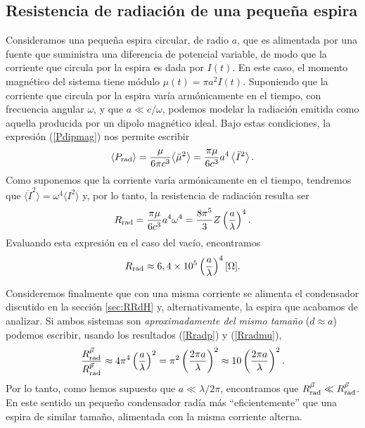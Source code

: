 \subsection{Resistencia de radiación de una pequeña espira}
Consideramos una pequeña espira circular, de radio $a$, que es alimentada por una fuente que suministra una diferencia de potencial variable, de modo que la corriente que circula por la espira es dada por $I(t)$. En este caso, el momento magnético del sistema tiene módulo $\mu(t)=\pi a^2I(t)$. Suponiendo que la corriente que circula por la espira varía armónicamente en el tiempo, con frecuencia angular $\omega$, y que $a\ll c/\omega$, podemos modelar la radiación emitida como aquella producida por un dipolo magnético ideal. Bajo estas condiciones, la expresión (\ref{Pdipmag}) nos permite escribir
\begin{equation}
\left\langle P_{\rm rad}\right\rangle=\frac{\mu}{6\pi c^3}{\left\langle \ddot{\mu}^2\right\rangle}=\frac{\pi\mu}{6c^3}{a^4}\left\langle \ddot{I}^ 2\right\rangle .
\end{equation}
Como suponemos que la corriente varía armónicamente en el tiempo, tendremos que $\langle\ddot{I}^ 2\rangle=\omega^4\langle I^ 2\rangle$ y, por lo tanto, la resistencia de radiación resulta ser
\begin{equation}
R_{\rm rad}=\frac{\pi\mu}{6c^3}{a^4\omega^4}
=\frac{8\pi^5}{3}Z\left(\frac{a}{\lambda}\right)^4.
\end{equation}
Evaluando esta expresión en el caso del vacío, encontramos
\begin{equation}\label{Rradmu}
R_{\rm rad}\approx 6,4\times 10^{5}\left(\frac{a}{\lambda}\right)^4 [\Omega].
\end{equation}

Consideremos finalmente que con una misma corriente se alimenta el condensador discutido en la sección \ref{sec:RRdH} y, alternativamente, la espira que acabamos de analizar. Si ambos sistemas son \textit{aproximadamente del mismo tamaño} ($d\approx a$) podemos escribir, usando los resultados (\ref{Rradp}) y (\ref{Rradmu}), 
\begin{equation}
\frac{R_{\rm rad}^{\vec\mu}}{R_{\rm rad}^{\vec{p}}}\approx 4\pi^4\left(\frac{a}{\lambda}\right)^2=\pi^2\left(\frac{2\pi a}{\lambda}\right)^2\approx 10\left(\frac{2\pi a}{\lambda}\right)^2.
\end{equation}
Por lo tanto, como hemos supuesto que $a\ll\lambda/2\pi$, encontramos que  $R_{\rm rad}^{\vec\mu}\ll R_{\rm rad}^{\vec{p}}$. En este sentido un pequeño condensador radía más ``eficientemente'' que una espira de similar tamaño, alimentada con la misma corriente alterna.



